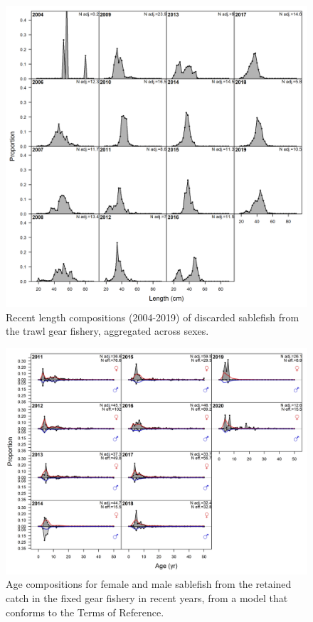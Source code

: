 \documentclass[11pt,
  english,
  a4paper,
]{article}
\begin{document}
\begin{figure}
\centering
\includegraphics[width=1\textwidth,height=1\textheight]{figs/comp_lendat_flt3mkt1.png}
\caption{Recent length compositions (2004-2019) of discarded sablefish from the trawl gear fishery, aggregated across sexes. \label{fig:discard_lencomps}}
\end{figure}

\tagmcend\tagstructend


\begin{figure}
\centering
\includegraphics[width=1\textwidth,height=1\textheight]{figs/tora_fleet1_agecomps.png}
\caption{Age compositions for female and male sablefish from the retained catch in the fixed gear fishery in recent years, from a model that conforms to the Terms of Reference. \label{fig:torafleet1agecomps}}
\end{figure}
\end{document}
